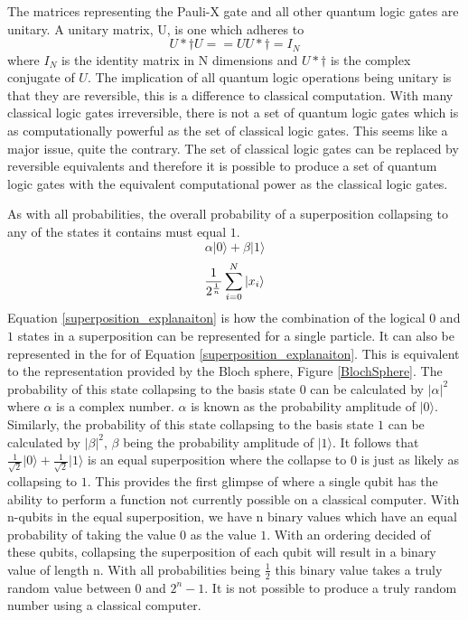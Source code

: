 \documentclass[authoryearcitations]{UoYCSproject}
\begin{document}
The matrices representing the Pauli-X gate and all other quantum logic gates are unitary.
A unitary matrix, U, is one which adheres to
\begin{equation}
U*{\dagger}
U == UU*{\dagger} = I_N
\end{equation}
where $I_N$ is the identity matrix in N dimensions and $U*{\dagger}$ is the complex conjugate of $U$.
The implication of all quantum logic operations being unitary is that they are reversible, this is a difference to classical computation.
With many classical logic gates irreversible, there is not a set of quantum logic gates which is as computationally powerful as the set of classical logic gates.
This seems like a major issue, quite the contrary.
The set of classical logic gates can be replaced by reversible equivalents and therefore it is possible to produce a set of quantum logic gates with the equivalent computational power as the classical logic gates.

As with all probabilities, the overall probability of a superposition collapsing to any of the states it contains must equal $1$.
\begin{equation}
\label{superposition_explanaiton}
\alpha\vert0\rangle+\beta\vert1\rangle
\end{equation}
\begin{equation}
\label{superposition_explanaiton_sum}
\frac{1}{2^{\frac{1}{n}}}\sum\limits_{i=0}^N \left\vert{x_i}\right\rangle
\end{equation}
Equation \eqref{superposition_explanaiton} is how the combination of the logical $0$ and $1$ states in a superposition can be represented for a single particle.
It can also be represented in the for of Equation \eqref{superposition_explanaiton}.
This is equivalent to the representation provided by the Bloch sphere, Figure \ref{BlochSphere}.
The probability of this state collapsing to the basis state $0$ can be calculated by $\vert\alpha\vert^2$ where $\alpha$ is a complex number.
$\alpha$ is known as the probability amplitude of $\vert0\rangle$.
Similarly, the probability of this state collapsing to the basis state $1$ can be calculated by $\vert\beta\vert^2$, $\beta$ being the probability amplitude of $\vert1\rangle$.
It follows that $\frac{1}{\sqrt{2}}\vert0\rangle+\frac{1}{\sqrt{2}}\vert1\rangle$ is an equal superposition where the collapse to 0 is just as likely as collapsing to $1$.
This provides the first glimpse of where a single qubit has the ability to perform a function not currently possible on a classical computer.
With n-qubits in the equal superposition, we have n binary values which have an equal probability of taking the value $0$ as the value $1$.
With an ordering decided of these qubits, collapsing the superposition of each qubit will result in a binary value of length n.
With all probabilities being $\frac{1}{2}$ this binary value takes a truly random value between $0$ and $2^n-1$.
It is not possible to produce a truly random number using a classical computer.
\end{document}

